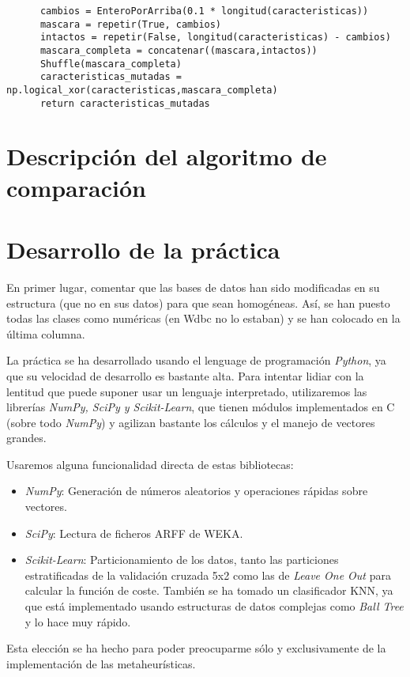\documentclass[a4paper, 11pt]{article}
\begin{document}
    \begin{verbatim}
      cambios = EnteroPorArriba(0.1 * longitud(caracteristicas))
      mascara = repetir(True, cambios)
      intactos = repetir(False, longitud(caracteristicas) - cambios)
      mascara_completa = concatenar((mascara,intactos))
      Shuffle(mascara_completa)
      caracteristicas_mutadas = np.logical_xor(caracteristicas,mascara_completa)
      return caracteristicas_mutadas
    \end{verbatim}
  \section{Descripción del algoritmo de comparación}
    
  \section{Desarrollo de la práctica}
    En primer lugar, comentar que las bases de datos han sido modificadas en su estructura (que no en sus datos) para que sean homogéneas. Así, se han puesto todas las clases como numéricas (en Wdbc no lo estaban) y se han colocado en la última columna.

    La práctica se ha desarrollado usando el lenguage de programación \emph{Python}, ya que su velocidad de desarrollo es bastante alta. Para intentar lidiar con la lentitud que puede suponer usar un lenguaje interpretado, utilizaremos las librerías \emph{NumPy, SciPy y Scikit-Learn}, que tienen módulos implementados en C (sobre todo \emph{NumPy}) y agilizan bastante los cálculos y el manejo de vectores grandes.

    Usaremos alguna funcionalidad directa de estas bibliotecas:
    \begin{itemize}
      \item \emph{NumPy}: Generación de números aleatorios y operaciones rápidas sobre vectores.
      \item \emph{SciPy}: Lectura de ficheros ARFF de WEKA.
      \item \emph{Scikit-Learn}: Particionamiento de los datos, tanto las particiones estratificadas de la validación cruzada 5x2 como las de \emph{Leave One Out} para calcular la función de coste. También se ha tomado un clasificador KNN, ya que está implementado usando estructuras de datos complejas como \emph{Ball Tree} y lo hace muy rápido.
    \end{itemize}

    Esta elección se ha hecho para poder preocuparme sólo y exclusivamente de la implementación de las metaheurísticas.
\end{document}
